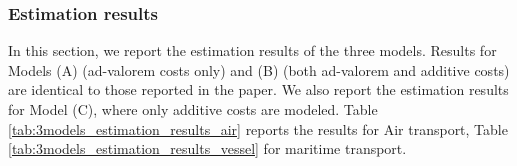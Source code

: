 \documentclass[11pt,twoside, authoryear]{elsarticle}
\begin{document}
\subsubsection{Estimation results}

In this section, we report the estimation results of the three models. Results for Models (A) (ad-valorem costs only) and (B) (both ad-valorem and additive costs) are identical to those reported in the paper. We also report the estimation results for Model (C), where only additive costs are modeled. Table \ref{tab:3models_estimation_results_air} reports the results for Air transport, Table \ref{tab:3models_estimation_results_vessel} for maritime transport.

\setcounter{table}{0}
\renewcommand{\thetable}{A.\arabic{table}}
\end{document}
